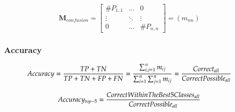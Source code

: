 \documentclass[10pt]{article}
\newif\ifen
\newif\ifde
\newcommand{\en}[1]{\ifen#1\fi}
\newcommand{\de}[1]{\ifde#1\fi}
\begin{document}
			\begin{equation}
				\boldsymbol{M}_{confusion} = \begin{bmatrix}
					\#P_{1,1} & \dots & 0 \\
					\vdots & \ddots & \vdots \\
					0 & \dots & \#P_{n,n}
				\end{bmatrix} = (m_{nn})
				\label{eq:equation_confusion_matrix_correct}
			\end{equation}

		\subsubsection{Accuracy}
			\de{Die \textbf{Top-1-Genauigkeit} ist wahrscheinlich die wichtigste Genauigkeit. Sie sagt sagt aus, zu wieviel Prozent die jeweils beste Aussage des Modells auf die Daten des Validierungssets mit der erwarteten Klasse übereinstimmt.}
			\en{\textbf{Top-1 accuracy} is probably the most important accuracy. It tells one the percentage of the model's best prediction of the data in the validation set that matches the expected class.}

			\begin{equation}
				Accuracy = {{TP + TN} \over {TP + TN + FP + FN}} = {{\sum_{i,j=1}^{n} m_{ij}} \over {\sum_{i=1}^{n} \sum_{j=1}^{n} m_{ij}}} = {{Correct_{all}} \over {CorrectPossible_{all}}}
			\end{equation}

			\de{Die \textbf{Top-5-Genauigkeit} ist eine weitere Genauigkeitsangabe. Jedoch wird hier nicht nur der beste Treffer einbezogen, sondern auch die nächsten weiteren vier. Sobald die richtige Klasse innerhalb der ersten fünf vorhergesagten Klassen gefunden werden kann, so ist auch diese Vorhersage wahr:}
			\en{The \textbf{Top 5 Accuracy} is another accuracy specification. However, not only the best hit is included here, but also the next four. As soon as the correct class can be found within the first five predicted classes, this prediction is also true:}
			
			\begin{equation}
				Accuracy_{top-5} = {{CorrectWithinTheBest5Classes_{all}} \over {CorrectPossible_{all}}}
			\end{equation}
\end{document}
